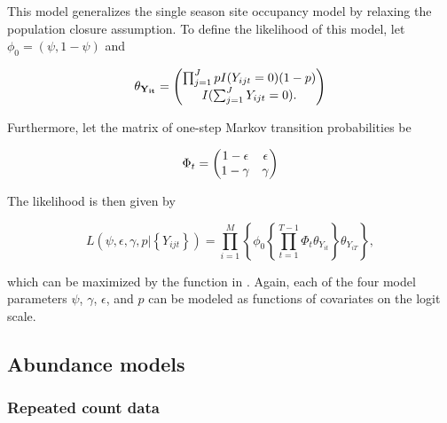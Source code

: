 \documentclass[article,shortnames]{jss}
\newcommand{\um}{\pkg{unmarked}}
\begin{document}
This model generalizes the single season site occupancy model by relaxing the
population closure assumption. To define the likelihood of this model,
let $\phi_0 = (\psi, 1-\psi)$ and

\begin{equation}
  \theta_{{\bf Y_{it}}} =
  \begin{pmatrix}
    \prod_{j=1}^{J} p I(Y_{ijt}=0)(1-p) \\
    I(\sum_{j=1}^{J} Y_{ijt}=0). \notag\\
  \end{pmatrix}
\end{equation}

Furthermore, let the matrix of one-step Markov transition probabilities be

\begin{equation}
  \Phi_t =
  \begin{pmatrix}
    1-\epsilon & \epsilon \\
    1-\gamma & \gamma \notag\\
  \end{pmatrix}
\end{equation}

The likelihood is then given by

\begin{equation}
L(\psi,\epsilon,\gamma,p | \left\{Y_{ijt}\right\}) =
 \prod_{i=1}^{M} \left\{
    \phi_0 \left\{ \prod_{t=1}^{T-1} \Phi_t \theta_{Y_{it}}
        \right\} \theta_{Y_{iT}} \right\},
\end{equation}

which can be maximized by the  function in \um. Again,
each of the four model parameters $\psi$, $\gamma$,
$\epsilon$, and $p$ can be modeled as functions of covariates on the logit
scale.


\subsection{Abundance models}

\subsubsection{Repeated count data}
\label{sec:repeated-count-data}
\end{document}
